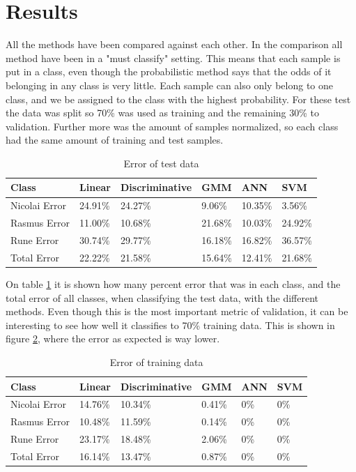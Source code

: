 \section{Results}

All the methods have been compared against each other. In the comparison all method have been in a "must classify" setting. This means that each sample is put in a class, even though the probabilistic method says that the odds of it belonging in any class is very little. Each sample can also only belong to one class, and we be assigned to the class with the highest probability. For these test the data was split so 70\% was used as training and the remaining 30\% to validation. Further more was the amount of samples normalized, so each class had the same amount of training and test samples.


\begin{table}[H]
\centering
\begin{tabular}{llllll}
\hline
Class		&	Linear	&  Discriminative  & GMM  & ANN	& SVM \\ \hline
Nicolai Error &	24.91\%  & 24.27\%  &  9.06\%  & 10.35\%  &  3.56\% \\
Rasmus Error  &	11.00\%  & 10.68\%  & 21.68\%  & 10.03\%  & 24.92\% \\
Rune Error	  &	30.74\%  & 29.77\%  & 16.18\%  & 16.82\%  & 36.57\% \\ \hline
Total Error	  &	22.22\%  & 21.58\%  & 15.64\%  & 12.41\%  & 21.68\% \\ \hline
\end{tabular}
\caption{ Error of test data }
\label{tab:restest}
\end{table}

On table \ref{tab:restest} it is shown how many percent error that was in each class, and the total error of all classes, when classifying the test data, with the different methods. Even though this is the most important metric of validation, it can be interesting to see how well it classifies to 70\% training data. This is shown in figure \ref{tab:restrain}, where the error as expected is way lower.

\begin{table}[H]
\centering
\begin{tabular}{llllll}
\hline
Class		&	Linear	&  Discriminative  & GMM  & ANN	& SVM \\ \hline
Nicolai Error &	14.76\%  & 10.34\%  &  0.41\%  & 0\%  &  0\% \\
Rasmus Error  &	10.48\%  & 11.59\%  & 0.14\%  & 0\%  & 0\% \\
Rune Error	  &	23.17\%  & 18.48\%  & 2.06\%  & 0\%  & 0\% \\ \hline
Total Error	  &	16.14\%  & 13.47\%  & 0.87\%  & 0\%  & 0\% \\ \hline
\end{tabular}
\caption{ Error of training data }
\label{tab:restrain}
\end{table}

